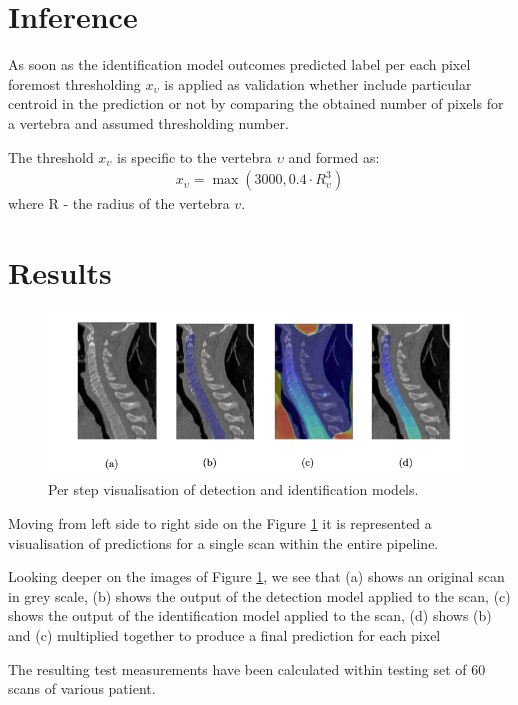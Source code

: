 \section{Inference}
As soon as the identification model outcomes predicted label per each pixel foremost thresholding $x_\upsilon$ is applied as validation whether include particular centroid in the prediction or not by comparing the obtained  number of pixels for a vertebra and assumed thresholding number.

The threshold $x_\upsilon$ is specific to the vertebra $\upsilon$ and formed as:
\begin{align*}
  x_\upsilon = \max(3000, 0.4 \cdot R_\upsilon^3) 
\end{align*}
where R - the radius of the vertebra $v$.

\section{Results}
\begin{figure}[h]
    \centering \includegraphics[width=11cm]{images/detection_identification_steps.png}
    \caption {Per step visualisation of detection and identification  models.}
    \label{fig:step_step_predictions}
\end{figure}
Moving from left side to right side on the Figure \ref{fig:step_step_predictions} it is represented a visualisation of predictions for a single scan within the entire pipeline. 

Looking deeper on the images of 
Figure \ref{fig:step_step_predictions}, we see that (a) shows an original scan in grey scale, (b) shows the output of the detection model applied to the scan, (c) shows the output of the identification model applied to the scan, (d) shows (b) and (c) multiplied together to produce a final prediction for each pixel

The resulting test measurements have been calculated within testing set of 60 scans of various patient.

